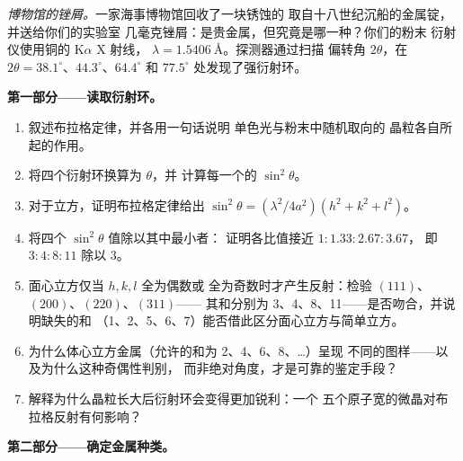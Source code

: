 \begin{problem}\label{pb:b3:crystalline-solids:1}
\emph{博物馆的锉屑。}一家海事博物馆回收了一块锈蚀的
取自十八世纪沉船的金属锭，并送给你们的实验室
几毫克锉屑：是贵金属，但究竟是哪一种？你们的粉末
衍射仪使用铜的 K$\alpha$ X 射线，
$\lambda = \qty{1.5406}{\angstrom}$。探测器通过扫描
偏转角 $2\theta$，在 $2\theta =
38.1^\circ$、$44.3^\circ$、$64.4^\circ$ 和 $77.5^\circ$ 处发现了强衍射环。

\medskip\noindent\textbf{第一部分——读取衍射环。}

\begin{enumerate}
  \item 叙述布拉格定律，并各用一句话说明
        单色光与粉末中随机取向的
        晶粒各自所起的作用。
  \item 将四个衍射环换算为 $\theta$，并
        计算每一个的 $\sin^2\theta$。
  \item 对于立方，证明布拉格定律给出
        $\sin^2\theta = (\lambda^2/4a^2)(h^2 + k^2 + l^2)$。
  \item 将四个 $\sin^2\theta$ 值除以其中最小者：
        证明各比值接近 $1 : 1.33 : 2.67 : 3.67$，
        即 $3 : 4 : 8 : 11$ 除以 3。
  \item 面心立方仅当 $h, k, l$ 全为偶数或
        全为奇数时才产生反射：检验 $(111)$、$(200)$、$(220)$、$(311)$——
        其和分别为 3、4、8、11——是否吻合，并说明缺失的和
        （1、2、5、6、7）能否借此区分面心立方与简单立方。
  \item 为什么体心立方金属（允许的和为 2、4、6、8、\dots）呈现
        不同的图样——以及为什么这种奇偶性判别，
        而非绝对角度，才是可靠的鉴定手段？
  \item 解释为什么晶粒长大后衍射环会变得更加锐利：一个
        五个原子宽的微晶对布拉格反射有何影响？
\end{enumerate}

\medskip\noindent\textbf{第二部分——确定金属种类。}


\end{problem}

